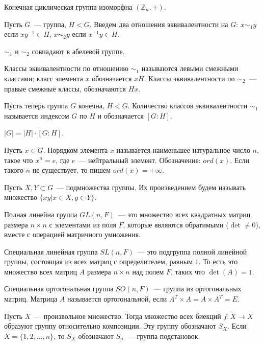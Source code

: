 \documentclass[12pt]{article}
\begin{document}
	\begin{theorem}
		Конечная циклическая группа изоморфна $(\mathbb{Z}_n, +)$.
	\end{theorem}
	\begin{definition}
		Пусть $G$~--- группа, $H < G$. Введем два отношения эквивалентности на $G$: $x \sim_1 y$ если $xy^{-1} \in H$, $x \sim_2 y$ если $x^{-1}y \in H$.
	\end{definition}
	\begin{statement}
		$\sim_1$ и $\sim_2$ совпадают в абелевой группе.
	\end{statement}
	\begin{note}
		Классы эквивалентности по отношению $\sim_1$ называются левыми смежными классами; класс элемента $x$ обозначается $xH$. Классы эквивалентности по $\sim_2$~--- правые смежные классы, обозначаются $Hx$.
	\end{note}
	\begin{definition}
		Пусть теперь группа $G$ конечна, $H < G$. Количество классов эквивалентности $\sim_1$ называется индексом $G$ по $H$ и обозначается $[G : H]$.
	\end{definition}
	\begin{theorem}[Лагранжа]
		$|G| = |H| \cdot [G : H]$.
	\end{theorem}
	\begin{definition}
		Пусть $x \in G$. Порядком элемента $x$ называется наименьшее натуральное число $n$, такое что $x^n = e$, где $e$~--- нейтральный элемент. Обозначение: $ord(x)$. Если такого $n$ не существует, то пишем $ord(x) = + \infty$.
	\end{definition}
	\begin{definition}
		Пусть $X, Y \subset G$~--- подмножества группы. Их произведением будем называть множество $\{ xy | x \in X, y \in Y \}$.
	\end{definition}
	\begin{definition}
		Полная линейна группа $GL(n, F)$~--- это множество всех квадратных матриц размера $n \times n$ с элементами из поля $F$, которые являются обратимыми ($\det \not= 0$), вместе с операцией матричного умножения.
	\end{definition}
	\begin{definition}
		Специальная линейная группа $SL(n, F)$~--- это подгруппа полной линейной группы, состоящая из всех матриц с определителем, равным $1$. То есть это множество всех матриц $A$ размера $n \times n$ над полем $F$, таких что $\det(A) = 1$.
	\end{definition}
	\begin{definition}
		Специальная ортогональная группа $SO(n, F)$~--- группа из ортогональных матриц. Матрица $A$ называется ортогональной, если $A^T \times A = A \times A^T = E$.
	\end{definition}
	\begin{statement}
		Пусть $X$~--- произвольное множество. Тогда множество всех биекций $f: X \rightarrow X$ образуют группу относительно композиции. Эту группу обозначают $S_X$. Если $X = \{ 1, 2, \dots, n \}$, то $S_X$ обозначают $S_n$~--- группа подстановок.
	\end{statement}
\end{document}
